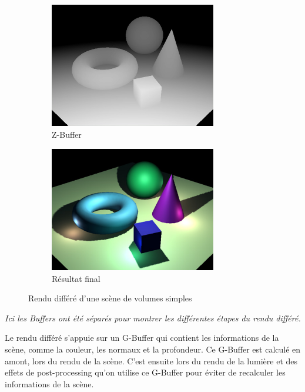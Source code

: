 \begin{figure}[h]
\begin{subfigure}{0.5\textwidth}
        \includegraphics[width=0.8\textwidth]{images/Deferred_rendering_pass_dep.jpg}
        \caption{Z-Buffer}
        \label{fig:drendering_pass_depth}
    \end{subfigure}
    \begin{subfigure}{0.5\textwidth}
        \centering
        \includegraphics[width=0.8\textwidth]{images/Deferred_rendering_pass_res.jpg}
        \caption{Résultat final}
        \label{fig:drendering_result}
    \end{subfigure}
    \caption{Rendu différé d'une scène de volumes simples}
    \label{fig:defferred_rendering}
\end{figure}

\emph{Ici les Buffers ont été séparés pour montrer les différentes étapes du rendu différé.}

Le rendu différé s'appuie sur un G-Buffer qui contient les informations de la scène,
comme la couleur, les normaux et la profondeur. Ce G-Buffer est calculé en amont, lors
du rendu de la scène. C'est ensuite lors du rendu de la lumière et des effets de
post-processing qu'on utilise ce G-Buffer pour éviter de recalculer les informations de
la scène.
\newpage
